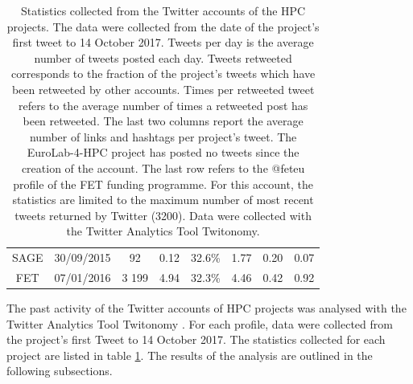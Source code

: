 {\begin{landscape}
\begin{table}
\begin{adjustwidth}{-1.5cm}{}
{\begin{tabular}{*{8}{c}}
       SAGE & 30/09/2015 & 92 & 0.12 & 32.6\% & 1.77 & 0.20 & 0.07 \\ 
       FET & 07/01/2016 & 3 199 & 4.94 & 32.3\% & 4.46 & 0.42 & 0.92 \\
       \hline
       \hline
    \end{tabular}
   }     
   \caption{Statistics collected from the Twitter accounts of the HPC projects. The data were collected from the date of the project's first tweet to 14 October 2017. Tweets per day is the average number of tweets posted each day. Tweets retweeted corresponds to the fraction of the project's tweets which have been retweeted by other accounts. Times per retweeted tweet refers to the average number of times a retweeted post has been retweeted. The last two columns report the average number of links and hashtags per project's tweet. The EuroLab-4-HPC project has posted no tweets since the creation of the account. The last row refers to the @fet\textunderscore eu profile of the FET funding programme. For this account, the statistics are limited to the maximum number of most recent tweets returned by Twitter (3200). Data were collected with the Twitter Analytics Tool Twitonomy.} \label{HPC_Twitter_activity}
   \end{adjustwidth} 
   \end{table}
   \end{landscape}
 \clearpage
}

The past activity of the Twitter accounts of HPC projects was analysed with the Twitter Analytics Tool Twitonomy \cite{Twitonomy}. For each profile, data were collected from the project's first Tweet to 14 October 2017. The statistics collected for each project are listed in table \ref{HPC_Twitter_activity}. The results of the analysis are outlined in the following subsections.

